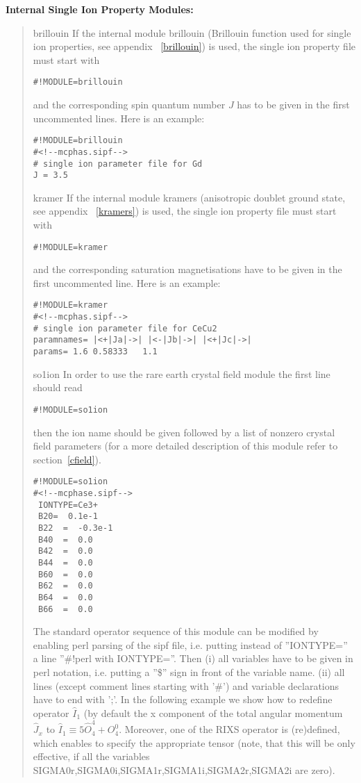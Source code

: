 \vspace{0.5cm} 
{\bf Internal Single Ion Property Modules:} 
\begin{quote}
\item[{\prg brillouin}]
If the internal module {\prg brillouin}
 (Brillouin function used for single ion properties,
  see appendix ~\ref{brillouin}) is used,
the single ion property file must start with
\begin{verbatim}#!MODULE=brillouin\end{verbatim} and
the corresponding spin
 quantum number $J$ has to be given in the first uncommented
lines.
Here is an example:
\begin{verbatim}
#!MODULE=brillouin
#<!--mcphas.sipf-->
# single ion parameter file for Gd
J = 3.5
\end{verbatim}
\item [{\prg kramer}] If the internal module {\prg kramers} (anisotropic doublet ground state, see appendix %
~\ref{kramers}) is used,
the single ion property file must start with
\begin{verbatim}#!MODULE=kramer\end{verbatim} and
the corresponding saturation magnetisations have to be given in the first uncommented
line.
Here is an example:
\begin{verbatim}
#!MODULE=kramer
#<!--mcphas.sipf-->
# single ion parameter file for CeCu2
paramnames= |<+|Ja|->| |<-|Jb|->| |<+|Jc|->|
params= 1.6 0.58333   1.1
\end{verbatim}
\item[{\prg so1ion\index{so1ion}}]In order to use the rare earth crystal field module the first line should read
\begin{verbatim}#!MODULE=so1ion\end{verbatim}

then the ion name should be given followed by a list of nonzero crystal field parameters
(for a more detailed description of this module refer to section~\ref{cfield}).

\begin{verbatim}
#!MODULE=so1ion
#<!--mcphase.sipf-->
 IONTYPE=Ce3+
 B20=  0.1e-1                                           
 B22  =  -0.3e-1                                       
 B40  =  0.0
 B42  =  0.0
 B44  =  0.0
 B60  =  0.0
 B62  =  0.0
 B64  =  0.0
 B66  =  0.0
\end{verbatim}

The standard operator sequence of this module can be modified by enabling 
perl parsing
of the sipf file, i.e. putting instead of ''IONTYPE='' a line ''\#!perl with IONTYPE=''.
Then (i) all variables have to be given in perl notation, i.e. putting a ''\$'' sign
in front of the variable name. (ii) all lines (except comment lines starting with
'\#') and variable declarations have to end with ';'. In the following example
we show how to redefine operator $\hat I_1$ (by default the x component of the
total angular momentum $\hat J_x$ to $\hat I_1 \equiv 5 \hat O_4^4 + O_4^0$.
Moreover, one of the RIXS operator is (re)defined, which enables to specify 
the appropriate tensor (note, that this will be only effective, if all the variables
SIGMA0r,SIGMA0i,SIGMA1r,SIGMA1i,SIGMA2r,SIGMA2i are zero).


\end{quote}
